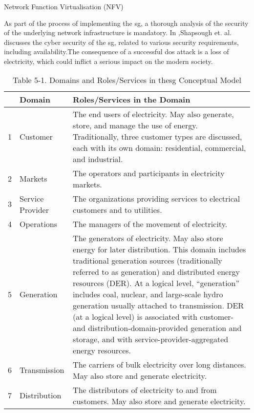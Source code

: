 Network Function Virtualisation (NFV) 




As part of the process of implementing the \acrshort{sg}, a thorough analysis of the security of the underlying network infrastructure is mandatory. 
In \cite{Shapsough2015},Shapsough et. al. discusses the cyber security of the \acrshort{sg}, related to various security requirements, including availability.The consequence of a successful \acrshort{dos} attack is a loss of electricity, which could inflict a serious impact on the modern society.




\begin{table}[ht]
\centering
\begin{tabular}{|c|l| p{8.5cm}| }
\hline
&Domain &Roles/Services in the Domain \\ \hline
 1&Customer &The end users of electricity. May also generate, store, and manage the
use of energy. Traditionally, three customer types are discussed, each
with its own domain: residential, commercial, and industrial. \\ \hline
 2&Markets&The operators and participants in electricity markets. \\\hline
 3&Service Provider &The organizations providing services to electrical customers and to
 utilities. \\\hline
 4&Operations & The managers of the movement of electricity. \\ \hline
 5&Generation &The generators of electricity. May also store energy for later
distribution. This domain includes traditional generation sources
(traditionally referred to as generation) and distributed energy
resources (DER). At a logical level, “generation” includes coal,
nuclear, and large-scale hydro generation usually attached to
transmission. DER (at a logical level) is associated with customer-
and distribution-domain-provided generation and storage, and with
service-provider-aggregated energy resources.\\ \hline
 6 & Transmission & The carriers of bulk electricity over long distances. May also store
and generate electricity. \\ \hline
 7 &Distribution &The distributors of electricity to and from customers. May also store
and generate electricity. \\
\hline
\end{tabular}
\caption{Table 5-1. Domains and Roles/Services in the\acrlong{sg} Conceptual Model}
\label{tab:SmartGRID-Roles-of-domains}
\end{table}









